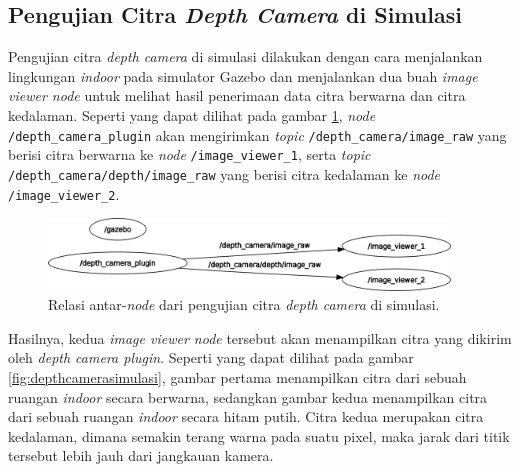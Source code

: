 \subsection{Pengujian Citra \emph{Depth Camera} di Simulasi}
\label{subsec:citradepthsimulasi}

Pengujian citra \emph{depth camera} di simulasi dilakukan dengan cara menjalankan lingkungan \emph{indoor} pada simulator Gazebo dan menjalankan dua buah \emph{image viewer node} untuk melihat hasil penerimaan data citra berwarna dan citra kedalaman.
Seperti yang dapat dilihat pada gambar \ref{fig:rosgraphdepthcameraplugin},
  \emph{node} \lstinline{/depth_camera_plugin} akan mengirimkan \emph{topic} \lstinline{/depth_camera/image_raw} yang berisi citra berwarna ke \emph{node} \lstinline{/image_viewer_1},
  serta \emph{topic} \lstinline{/depth_camera/depth/image_raw} yang berisi citra kedalaman ke \emph{node} \lstinline{/image_viewer_2}.

\begin{figure}[ht]
  \centering
  \includegraphics[width=0.95\textwidth,keepaspectratio]{gambar/rosgraph-depth-camera-plugin.png}
  \caption{Relasi antar-\emph{node} dari pengujian citra \emph{depth camera} di simulasi.}
  \label{fig:rosgraphdepthcameraplugin}
\end{figure}

Hasilnya, kedua \emph{image viewer node} tersebut akan menampilkan citra yang dikirim oleh \emph{depth camera plugin}.
Seperti yang dapat dilihat pada gambar \ref{fig:depthcamerasimulasi},
  gambar pertama menampilkan citra dari sebuah ruangan \emph{indoor} secara berwarna,
  sedangkan gambar kedua menampilkan citra dari sebuah ruangan \emph{indoor} secara hitam putih.
Citra kedua merupakan citra kedalaman, dimana semakin terang warna pada suatu pixel,
  maka jarak dari titik tersebut lebih jauh dari jangkauan kamera.

